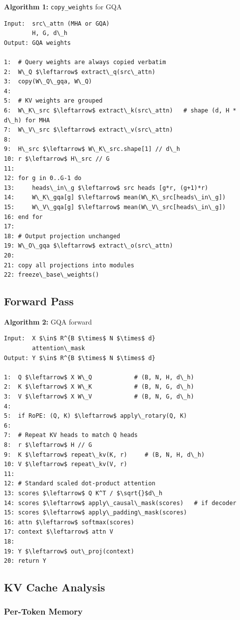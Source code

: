 \textbf{Algorithm 1:} \texttt{copy\_weights} for GQA
\begin{lstlisting}
Input:  src\_attn (MHA or GQA)
        H, G, d\_h
Output: GQA weights

1:  # Query weights are always copied verbatim
2:  W\_Q $\leftarrow$ extract\_q(src\_attn)
3:  copy(W\_Q\_gqa, W\_Q)
4:
5:  # KV weights are grouped
6:  W\_K\_src $\leftarrow$ extract\_k(src\_attn)   # shape (d, H * d\_h) for MHA
7:  W\_V\_src $\leftarrow$ extract\_v(src\_attn)
8:
9:  H\_src $\leftarrow$ W\_K\_src.shape[1] // d\_h
10: r $\leftarrow$ H\_src // G
11:
12: for g in 0..G-1 do
13:     heads\_in\_g $\leftarrow$ src heads [g*r, (g+1)*r)
14:     W\_K\_gqa[g] $\leftarrow$ mean(W\_K\_src[heads\_in\_g])
15:     W\_V\_gqa[g] $\leftarrow$ mean(W\_V\_src[heads\_in\_g])
16: end for
17:
18: # Output projection unchanged
19: W\_O\_gqa $\leftarrow$ extract\_o(src\_attn)
20:
21: copy all projections into modules
22: freeze\_base\_weights()
\end{lstlisting}

\subsection{Forward Pass}

\textbf{Algorithm 2:} GQA forward
\begin{lstlisting}
Input:  X $\in$ R^{B $\times$ N $\times$ d}
        attention\_mask
Output: Y $\in$ R^{B $\times$ N $\times$ d}

1:  Q $\leftarrow$ X W\_Q            # (B, N, H, d\_h)
2:  K $\leftarrow$ X W\_K            # (B, N, G, d\_h)
3:  V $\leftarrow$ X W\_V            # (B, N, G, d\_h)
4:
5:  if RoPE: (Q, K) $\leftarrow$ apply\_rotary(Q, K)
6:
7:  # Repeat KV heads to match Q heads
8:  r $\leftarrow$ H // G
9:  K $\leftarrow$ repeat\_kv(K, r)     # (B, N, H, d\_h)
10: V $\leftarrow$ repeat\_kv(V, r)
11:
12: # Standard scaled dot-product attention
13: scores $\leftarrow$ Q K^T / $\sqrt{}$d\_h
14: scores $\leftarrow$ apply\_causal\_mask(scores)   # if decoder
15: scores $\leftarrow$ apply\_padding\_mask(scores)
16: attn $\leftarrow$ softmax(scores)
17: context $\leftarrow$ attn V
18:
19: Y $\leftarrow$ out\_proj(context)
20: return Y
\end{lstlisting}

\subsection{KV Cache Analysis}

\subsubsection{Per-Token Memory}

